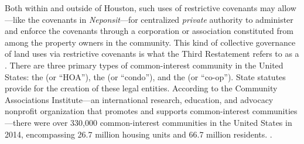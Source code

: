 

Both within and outside of Houston, such uses of restrictive covenants may
allow---like the covenants in \textit{Neponsit}---for centralized
\textit{private} authority to administer and enforce the covenants through a
corporation or association constituted from among the property owners in the
community. This kind of collective governance of land uses via restrictive
covenants is what the Third Restatement refers to as a . There are three primary types of common-interest community in the
United States: the  (or ``HOA''), the
 (or ``condo''), and the  (or
``co-op''). State statutes provide for the creation of these legal
entities. According to the Community Associations Institute---an international
research, education, and advocacy nonprofit organization that promotes and
supports common-interest communities---there were over 330,000 common-interest
communities in the United States in 2014, encompassing 26.7 million housing
units and 66.7 million residents. .


